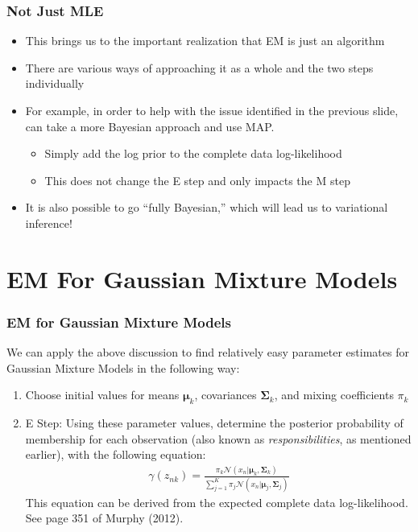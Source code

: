 \documentclass{beamer}
\begin{document}
\begin{frame}
\frametitle{Not Just MLE}
	\begin{itemize}
		\item This brings us to the important realization that EM is just an algorithm
		\item There are various ways of approaching it as a whole and the two steps individually
		\item For example, in order to help with the issue identified in the previous slide, can take a more Bayesian approach and use MAP. 
		\begin{itemize}
			\item Simply add the log prior to the complete data log-likelihood
			\item This does not change the E step and only impacts the M step
		\end{itemize}
		\item It is also possible to go ``fully Bayesian,'' which will lead us to variational inference! 
	\end{itemize}
\end{frame}

\section{EM For Gaussian Mixture Models}

\begin{frame}
\frametitle{EM for Gaussian Mixture Models}
We can apply the above discussion to find relatively easy parameter estimates for Gaussian Mixture Models in the following way:
	\begin{enumerate}
		\item Choose initial values for means $\boldsymbol{\mu}_k$, covariances $\boldsymbol{\Sigma}_{k}$, and mixing coefficients $\pi_k$
		\item E Step: Using these parameter values, determine the posterior probability of membership for each observation (also known as \textit{responsibilities}, as mentioned earlier), with the following equation:
		\begin{align}
			\gamma(z_{nk}) = \frac{\pi_k\mathcal{N}(x_n|\boldsymbol{\mu}_k, \boldsymbol{\Sigma}_k)}{\sum_{j = 1}^K \pi_j\mathcal{N}(x_n|\boldsymbol{\mu}_j, \boldsymbol{\Sigma}_j)}
		\end{align} 
		This equation can be derived from the expected complete data log-likelihood. See page 351 of Murphy (2012). 
	\end{enumerate}
\end{frame}
\end{document}
